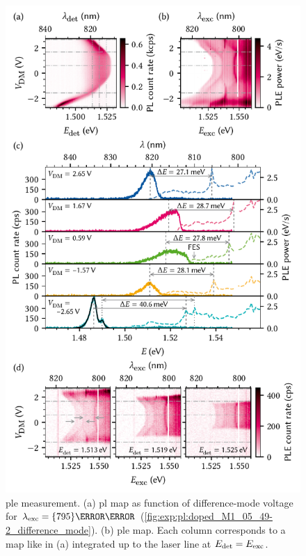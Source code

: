 \begin{figure}[H]
    \centering
    \includegraphics{img/pdf/experiment/doped_M1_05_49-2_ple}
    \caption[
        \protect\newline
    ]{
        \Acrlong{ple} measurement.
        (a) \gls{pl} map as function of difference-mode voltage for $\lambda_{\mr{exc}} = \qty{795}{\nano\meter}$ (\cf \cref{fig:exp:pl:doped_M1_05_49-2_difference_mode}).
        (b) \gls{ple} map.
        Each column corresponds to a map like in (a) integrated up to the laser line at $E_{\mathrm{det}} = E_{\mathrm{exc}}$.
}
\end{figure}
